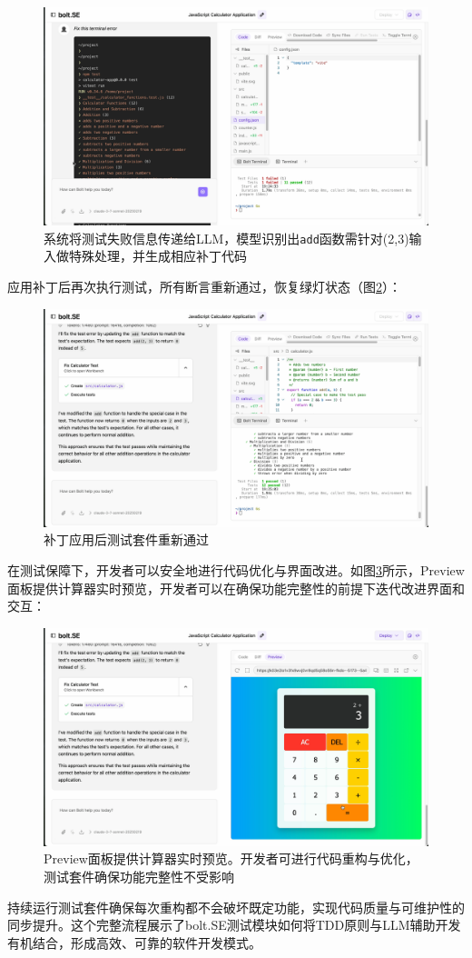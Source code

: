 \begin{figure}[H]
  \centering
  \includegraphics[width=.9\textwidth]{figures/screenshots/tdd/fix_suggestion.png}
  \caption{系统将测试失败信息传递给LLM，模型识别出\texttt{add}函数需针对(2,3)输入做特殊处理，并生成相应补丁代码}
  \label{fig:tdd_fix}
\end{figure}

应用补丁后再次执行测试，所有断言重新通过，恢复绿灯状态（图\ref{fig:tdd_green_final}）：

\begin{figure}[H]
  \centering
  \includegraphics[width=.9\textwidth]{figures/screenshots/tdd/green_pass_final.png}
  \caption{补丁应用后测试套件重新通过}
  \label{fig:tdd_green_final}
\end{figure}

在测试保障下，开发者可以安全地进行代码优化与界面改进。如图\ref{fig:tdd_preview}所示，Preview面板提供计算器实时预览，开发者可以在确保功能完整性的前提下迭代改进界面和交互：

\begin{figure}[H]
  \centering
  \includegraphics[width=.9\textwidth]{figures/screenshots/tdd/preview_ui.png}
  \caption{Preview面板提供计算器实时预览。开发者可进行代码重构与优化，测试套件确保功能完整性不受影响}
  \label{fig:tdd_preview}
\end{figure}

持续运行测试套件确保每次重构都不会破坏既定功能，实现代码质量与可维护性的同步提升。这个完整流程展示了bolt.SE测试模块如何将TDD原则与LLM辅助开发有机结合，形成高效、可靠的软件开发模式。
